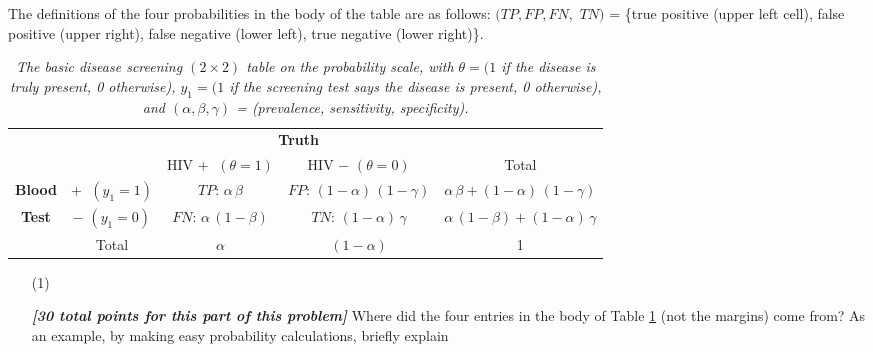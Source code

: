 \documentclass[12pt]{article}
\newcommand{\bi}[1]{\b{\i{#1}}}
\renewcommand{\b}[1]{\textbf{#1}}
\renewcommand{\i}[1]{\textit{#1}}
\begin{document}
\begin{itemize}
The definitions of the four probabilities in the body of the table are as follows: $( TP, FP, FN,$ $TN )$ = \{true positive (upper left cell), false positive (upper right), false negative (lower left), true negative (lower right)\}.

\begin{table}[t!]

\centering

\caption{\textit{The basic disease screening $( 2 \times 2 )$ table on the probability scale, with $\theta = ( 1$ if the disease is truly present, 0 otherwise), $y_1 = ( 1$ if the screening test says the disease is present, 0 otherwise), and $( \alpha, \beta, \gamma )$ = (prevalence, sensitivity, specificity).}}

\label{t:basic-screening-table}

\bigskip

\begin{tabular}{cc|c|c|c}

& \multicolumn{1}{c}{} & \multicolumn{2}{c}{\textbf{Truth}} \\

& \multicolumn{1}{c}{} & \multicolumn{1}{c}{HIV \textcircled{+} $( \theta = 1 )$} & \multicolumn{1}{c}{HIV \textcircled{$-$} $( \theta = 0 )$}  & Total \\ \cline{3-4}

\textbf{Blood} & \textcircled{+} $( y_1 = 1 )$ & $TP \! : \, \alpha \, \beta$ & $FP \! : \, ( 1 - \alpha ) \, ( 1 - \gamma )$ & $\alpha \, \beta + ( 1 - \alpha ) \, ( 1 - \gamma )$ \\ \cline{3-4}

\textbf{Test} & \textcircled{$-$} $( y_1 = 0 )$ & $FN \! : \, \alpha \, ( 1 - \beta )$ & $TN \! : \, ( 1 - \alpha ) \, \gamma$ & $\alpha \, ( 1 - \beta ) + ( 1 - \alpha ) \, \gamma$ \\ \cline{3-4}

& \multicolumn{1}{c}{Total} & \multicolumn{1}{c}{$\alpha$} & \multicolumn{1}{c}{$( 1 - \alpha )$} & 1

\end{tabular}

\end{table}

\begin{itemize}

\item[(1)]

\bi{[30 total points for this part of this problem]} Where did the four entries in the body of Table \ref{t:basic-screening-table} (not the margins) come from? As an example, by making easy probability calculations, briefly explain 


\end{itemize}
\end{itemize}
\end{document}
